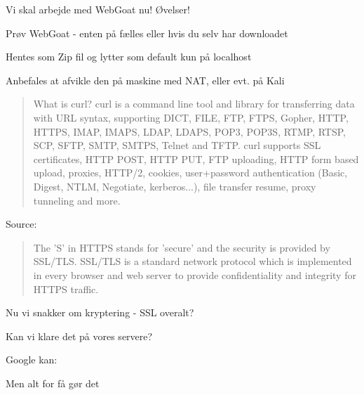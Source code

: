 \documentclass[20pt,landscape,a4paper,footrule]{foils}
\begin{document}

Vi skal arbejde med WebGoat nu! Øvelser!



\begin{list1}
\item Prøv WebGoat - enten på fælles eller hvis du selv har downloadet
\item Hentes som Zip fil og lytter som default kun på localhost
\item Anbefales at afvikle den på maskine med NAT, eller evt. på Kali
\end{list1}




\begin{quote}
	What is curl?
curl is a command line tool and library for transferring data with URL syntax, supporting DICT, FILE, FTP, FTPS, Gopher, HTTP, HTTPS, IMAP, IMAPS, LDAP, LDAPS, POP3, POP3S, RTMP, RTSP, SCP, SFTP, SMTP, SMTPS, Telnet and TFTP. curl supports SSL certificates, HTTP POST, HTTP PUT, FTP uploading, HTTP form based upload, proxies, HTTP/2, cookies, user+password authentication (Basic, Digest, NTLM, Negotiate, kerberos...), file transfer resume, proxy tunneling and more.
\end{quote}

Source: 



\begin{quote}
The 'S' in HTTPS stands for 'secure' and the security is provided by SSL/TLS. SSL/TLS is a standard network protocol which is implemented in every browser and web server to provide confidentiality and integrity for HTTPS traffic.
\end{quote}

\begin{list1}
\item Nu vi snakker om kryptering - SSL overalt?
\item Kan vi klare det på vores servere?
\pause
\item Google kan:\\
\item Men alt for få gør det
\end{list1}
\end{document}
